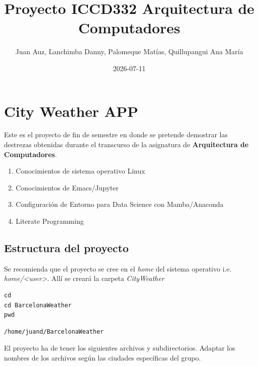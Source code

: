 \documentclass[11pt]{article}
\author{Juan Auz, Lanchimba Danny, Palomeque Matías, Quillupangui Ana María}
\date{2026-07-11}
\title{Proyecto ICCD332 Arquitectura de Computadores}
\begin{document}
\maketitle
\tableofcontents

\section{City Weather APP}
\label{sec:org1884e26}
Este es el proyecto de fin de semestre en donde se pretende demostrar
las destrezas obtenidas durante el transcurso de la asignatura de
\textbf{\textbf{Arquitectura de Computadores}}.

\begin{enumerate}
\item Conocimientos de sistema operativo Linux
\item Conocimientos de Emacs/Jupyter
\item Configuración de Entorno para Data Science con Mamba/Anaconda
\item Literate Programming
\end{enumerate}
\subsection{Estructura del proyecto}
\label{sec:orga705a8f}
Se recomienda que el proyecto se cree en el \emph{home} del sistema
operativo i.e. \emph{home/<user>}. Allí se creará la carpeta \emph{CityWeather}
\begin{verbatim}
cd
cd BarcelonaWeather 
pwd
\end{verbatim}

\label{org93fa8ec}
\begin{verbatim}
/home/juand/BarcelonaWeather
\end{verbatim}


El proyecto ha de tener los siguientes archivos y
subdirectorios. Adaptar los nombres de los archivos según las ciudades
específicas del grupo.
\end{document}
